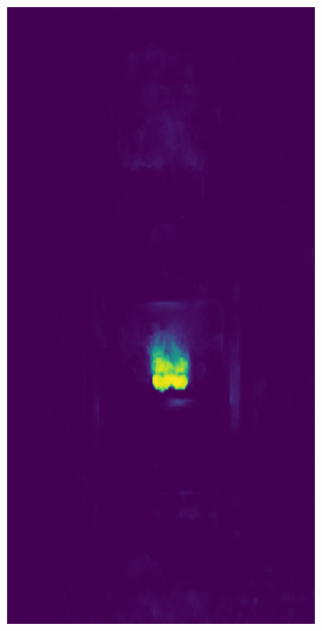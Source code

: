 \begin{figure}[H]
\begin{subfigure}[b]{\textwidth}
\begin{minipage}{0.45\textwidth}
            \includegraphics[width=\textwidth]{figures/appendix/appendix_DRAEM/JB/139_mask.png}
        \end{minipage}
        \begin{minipage}{0.45\textwidth}
            \centering

\end{minipage}
\end{subfigure}
\end{figure}

